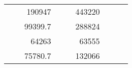 \begin{table}[H]
\begin{tabular}{|ccrccrccc}
\multicolumn{1}{|c|}{\cellcolor[HTML]{FFFFC7}}                                & \multicolumn{1}{c|}{\cellcolor[HTML]{DDFDFF}}                      & \multicolumn{1}{r|}{\cellcolor[HTML]{DAE8FC}190947}    & \multicolumn{1}{c|}{\cellcolor[HTML]{FFFFC7}}                                & \multicolumn{1}{c|}{\cellcolor[HTML]{DDFDFF}}                       & \multicolumn{1}{r|}{\cellcolor[HTML]{DDFDFF}443220}    &                                                                              &                                                                    &                                                        \\ \cline{3-3} \cline{6-6}
\multicolumn{1}{|c|}{\cellcolor[HTML]{FFFFC7}}                                & \multicolumn{1}{c|}{\cellcolor[HTML]{DDFDFF}}                      & \multicolumn{1}{r|}{\cellcolor[HTML]{DDFDFF}99399.7}   & \multicolumn{1}{c|}{\cellcolor[HTML]{FFFFC7}}                                & \multicolumn{1}{c|}{\cellcolor[HTML]{DDFDFF}}                       & \multicolumn{1}{r|}{\cellcolor[HTML]{DAE8FC}288824}    &                                                                              &                                                                    &                                                        \\ \cline{3-3} \cline{6-6}
\multicolumn{1}{|c|}{\cellcolor[HTML]{FFFFC7}}                                & \multicolumn{1}{c|}{\cellcolor[HTML]{DDFDFF}}                      & \multicolumn{1}{r|}{\cellcolor[HTML]{DAE8FC}64263}     & \multicolumn{1}{c|}{\cellcolor[HTML]{FFFFC7}}                                & \multicolumn{1}{c|}{\cellcolor[HTML]{DDFDFF}}                       & \multicolumn{1}{r|}{\cellcolor[HTML]{DDFDFF}63555}     &                                                                              &                                                                    &                                                        \\ \cline{3-3} \cline{6-6}
\multicolumn{1}{|c|}{\cellcolor[HTML]{FFFFC7}}                                & \multicolumn{1}{c|}{\cellcolor[HTML]{DDFDFF}}                      & \multicolumn{1}{r|}{\cellcolor[HTML]{DDFDFF}75780.7}   & \multicolumn{1}{c|}{\cellcolor[HTML]{FFFFC7}}                                & \multicolumn{1}{c|}{\cellcolor[HTML]{DDFDFF}}                       & \multicolumn{1}{r|}{\cellcolor[HTML]{DAE8FC}132066}    &                                                                              &                                                                    &                                                        \\ \cline{3-3} \cline{6-6}

\end{tabular}
\end{table}
